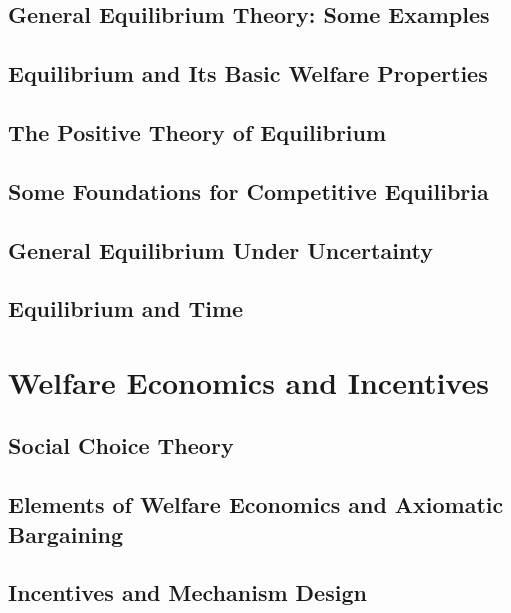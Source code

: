 \documentclass{report} %
\theoremstyle{definition}
\begin{document}
\chapter{General Equilibrium Theory: Some Examples}


\chapter{Equilibrium and Its Basic Welfare Properties}


\chapter{The Positive Theory of Equilibrium}


\chapter{Some Foundations for Competitive Equilibria}


\chapter{General Equilibrium Under Uncertainty}


\chapter{Equilibrium and Time}



\part{Welfare Economics and Incentives}

\chapter{Social Choice Theory}


\chapter{Elements of Welfare Economics and Axiomatic Bargaining}


\chapter{Incentives and Mechanism Design}


\printbibliography
\end{document}
